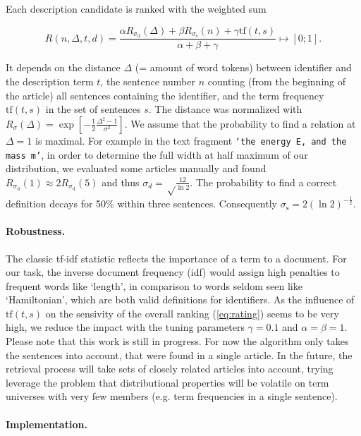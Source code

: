 \documentclass[runningheads]{llncs}
\begin{document}
Each description candidate is ranked with the weighted sum

\begin{equation} \label{eq:rating}
R(n,\Delta,t,d)=\frac{\alpha{R}_{\sigma_\mathrm d}(\Delta)
+\beta{R}_{\sigma_\mathrm s}(n)
+\gamma\mathrm{tf}(t,s)}{\alpha+\beta+\gamma} \mapsto [0;1].
\end{equation}

It depends on the distance $\Delta$ (= amount of word tokens) between
identifier and the description term $t$, the sentence number $n$ counting
(from the beginning of the article) all sentences containing the identifier,
and the term frequency $\mathrm{tf}(t,s)$ in the set of sentences $s$. The
distance was normalized with $R_\sigma(\Delta) = \exp\left[ -\frac{1}{2}
\frac{\Delta^2-1}{\sigma^2}\right].$ We assume that the probability to find a
relation at $\Delta=1$ is maximal. For example in the text fragment
\texttt{`the energy E, and the mass m'}, in order to determine the full width
at half maximum of our distribution, we evaluated some articles manually and
found $R_{\sigma_\mathrm d}(1)\approx 2 R_{\sigma_\mathrm d}(5)$ and thus
$\sigma_d=\sqrt\frac{12}{\ln 2}$. The probability to find a correct definition
decays for 50\% within three sentences. Consequently $\sigma_\mathrm
s=2\left({\ln 2}\right)^{-\frac{1}{2}}$.


\paragraph{Robustness.}

The classic tf-idf \cite{Salton86} statistic reflects the importance of a term
to a document. For our task, the inverse document frequency (idf) would assign
high penalties to frequent words like `length', in comparison to words seldom
seen like `Hamiltonian', which are both valid definitions for identifiers. As the
influence of $\mathrm{tf}(t,s)$ on the sensivity of the overall ranking
(\ref{eq:rating}) seems to be very high, we reduce the impact with the tuning
parameters $\gamma=0.1$ and $\alpha = \beta = 1$. Please note that this work
is still in progress. For now the algorithm only takes the sentences into
account, that were found in a single article. In the future, the retrieval
process will take sets of closely related articles into account, trying
leverage the problem that distributional properties will be volatile on term
universes with very few members (e.g. term frequencies in a single sentence).


\paragraph{Implementation.}
\end{document}
